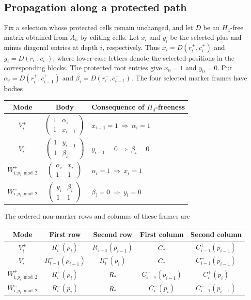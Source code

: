 \documentclass[11pt]{article}
\begin{document}
\subsection{Propagation along a protected path}
Fix a selection whose protected cells remain unchanged, and let $D$ be an
$H_4$-free matrix obtained from $A_h$ by editing cells. Let $x_i$ and $y_i$
be the selected plus and minus diagonal entries at depth $i$, respectively.
Thus $x_i=D(r_i^+,c_i^+)$ and $y_i=D(r_i^-,c_i^-)$, where lower-case
letters denote the selected positions in the corresponding blocks. The protected
root entries give $x_0=1$ and $y_0=0$. Put
$\alpha_i=D(r_i^+,c_{i-1}^+)$ and
$\beta_i=D(r_i^-,c_{i-1}^-)$. The four selected marker frames have bodies
\begin{center}
\begin{tabular}{c|c|l}\toprule
Mode&Body&Consequence of $H_4$-freeness\\\midrule
$V_i^+$&$\left(\begin{smallmatrix}1&\alpha_i\\1&x_{i-1}\end{smallmatrix}\right)$
 &$x_{i-1}=1\ \Longrightarrow\ \alpha_i=1$\\[7pt]
$V_i^-$&$\left(\begin{smallmatrix}1&y_{i-1}\\1&\beta_i\end{smallmatrix}\right)$
 &$y_{i-1}=0\ \Longrightarrow\ \beta_i=0$\\[7pt]
$W_{i,p_i\bmod2}^+$&$\left(\begin{smallmatrix}\alpha_i&x_i\\1&1\end{smallmatrix}\right)$
 &$\alpha_i=1\ \Longrightarrow\ x_i=1$\\[7pt]
$W_{i,p_i\bmod2}^-$&$\left(\begin{smallmatrix}y_i&\beta_i\\1&1\end{smallmatrix}\right)$
 &$\beta_i=0\ \Longrightarrow\ y_i=0$\\\bottomrule
\end{tabular}
\end{center}
The ordered non-marker rows and columns of these frames are
\begin{center}\small
\begin{tabular}{c|cc|cc}\toprule
Mode&First row&Second row&First column&Second column\\\midrule
$V_i^+$&$R_i^+(p_i)$&$R_{i-1}^+(p_{i-1})$&$C_*$&$C_{i-1}^+(p_{i-1})$\\
$V_i^-$&$R_{i-1}^-(p_{i-1})$&$R_i^-(p_i)$&$C_*$&$C_{i-1}^-(p_{i-1})$\\
$W_{i,p_i\bmod2}^+$&$R_i^+(p_i)$&$R_*$&$C_{i-1}^+(p_{i-1})$&$C_i^+(p_i)$\\
$W_{i,p_i\bmod2}^-$&$R_i^-(p_i)$&$R_*$&$C_i^-(p_i)$&$C_{i-1}^-(p_{i-1})$\\\bottomrule
\end{tabular}
\end{center}
\end{document}
